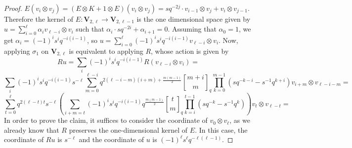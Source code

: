 \documentclass[letterpaper]{amsart}
\begin{document}
\begin{proof}
    $E(v_i\otimes v_j) = (E\otimes K + 1\otimes E)(v_i \otimes v_j) = sq^{-2j} \cdot v_{i-1} \otimes v_j + v_i \otimes v_{j-1}$.
    Therefore the kernel of $E: \textbf{V}_{2,\ell} \to \textbf{V}_{2,\ell - 1}$ is the one dimensional space given by $u = \sum_{i=0}^\ell \alpha_i v_{\ell - i} \otimes v_i$ such that $\alpha_i \cdot sq^{-2i} + \alpha_{i+1} = 0$. Assuming that $\alpha_0 = 1$, we get $\alpha_i = (-1)^is^iq^{-i(i-1)}$, so $u = \sum_{i=0}^\ell(-1)^i s^i q^{-i(i-1)} v_{\ell - i} \otimes v_i$.
    Now, applying $\sigma_1$ on $\textbf{V}_{2,\ell}$ is equivalent to applying $R$, whose action is given by
    $$Ru = \sum_i (-1)^i s^i q^{-i(i-1)} R(v_{\ell - i} \otimes v_i) = $$
    $$\sum_i  (-1)^i s^i q^{-i(i-1)} s^{-\ell} \sum_{m=0}^{\ell - i}q^{2(\ell -i -m)(i+m)+\frac{m(m-1)}{2}}{m + i \brack m}_q\prod_{k=0}^{m-1} (sq^{-k-i} - s^{-1}q^{k + i})v_{i + m} \otimes v_{\ell - i-m} = $$
    $$\sum_{t=0}^\ell q^{2(\ell - t)t}s^{-\ell}\left(\sum_{i + m =t}  (-1)^i s^i q^{-i(i-1)} q^{\frac{m(m-1)}{2}}{t \brack m}_q\prod_{k=i}^{t-1} (sq^{-k} - s^{-1}q^{k })\right)v_t \otimes v_{\ell - t} = $$
 In order to prove the claim, it suffices to consider the coordinate of $v_0 \otimes v_\ell$, as we already know that $R$ preserves the one-dimensional kernel of $E$. In this case, the coordinate of $Ru$ is $s^{-\ell}$ and the coordinate of $u$ is $(-1)^\ell s^\ell q^{-\ell(\ell - 1)}$.
\end{proof}
\end{document}
